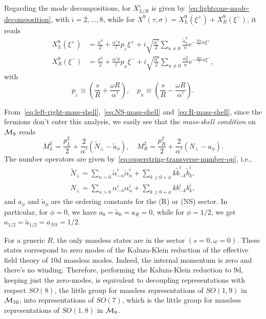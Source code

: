 Regarding the mode decompositions, for $X^i_{L/R}$ is given by~\eqref{eq:lightcone-mode-decomposition}, with $i = 2, \dots, 8$, while for $X^9 (\tau, \sigma) = X^9_L (\xi^+) + X^9_R (\xi^-)$, it reads
\begin{subequations}
\begin{align}
    X^{9}_L(\xi^+)     &= \frac{x^{9}}{2} + \frac{\alpha' \pi}{l} p_{\!_L} \xi^+ + i \sqrt{\frac{\alpha'}{2}} \sum_{n\neq 0} \frac{\tilde{\alpha}^{9}_n}{n}e^{-\frac{2\pi i}{l}n \xi^+} \\
    X^{9}_R(\xi^-)     &= \frac{x^{9}}{2} + \frac{\alpha' \pi}{l} p_{\!_R} \xi^- + i \sqrt{\frac{\alpha'}{2}} \sum_{n\neq 0} \frac{{\alpha}^{9}_n}{n}e^{-\frac{2\pi i}{l}n \xi^-},
\end{align}
\end{subequations}
with
\begin{equation}
    p_{\!_L} \equiv \left( \frac{s}{R} + \frac{\omega R}{\alpha'} \right), \quad p_{\!_R} \equiv \left( \frac{s}{R} - \frac{\omega R}{\alpha'} \right) .
\end{equation}

From~\eqref{eq:left-right-mass-shell},~\eqref{eq:NS-mass-shell} and~\eqref{eq:R-mass-shell}, since the fermions don't enter this analysis, we easily see that the \emph{mass-shell condition} on $\mathcal{M}_9$ reads
\begin{equation}\label{eq:superstring-mass-shell-m9}
    M^2_L = \frac{p^2_L}{2} + \frac{2}{\alpha'} \left( \tilde{N}_\perp - \tilde{a}_\phi \right), \quad M^2_R = \frac{p^2_R}{2} + \frac{2}{\alpha'} \left( {N}_\perp - {a}_\phi \right).
\end{equation}
The number operators are given by~\eqref{eq:superstring-transverse-number-op}, i.e.,
\begin{equation}\label{eq:superstring-numbers}
    \begin{aligned}
        \tilde{N}_\perp = \sum_{n > 0} \tilde{\alpha}_{-n}^i \tilde{\alpha}^i_n + \sum_{k \geq 0 + \phi} k \tilde{b}^i_{-k} \tilde{b}^i_k , \\
        N_\perp = \sum_{n > 0} \alpha_{-n}^i \alpha^i_n + \sum_{k \geq 0 + \phi} k b^i_{-k} b^i_k ,
\end{aligned}
\end{equation}
and $a_\phi$ and $\tilde{a}_\phi$ are the ordering constants for the (R) or (NS) sector. In particular, for $\phi = 0$, we have $a_0 = \tilde{a}_0 = a_{R} = 0$, while for $\phi = 1/2$, we get $a_{1/2} = \tilde{a}_{1/2} = a_{NS} = 1/2$.

For a generic $R$, the only massless states are in the sector $(s=0,\omega=0)$. These states correspond to zero modes of the Kaluza-Klein reduction of the effective field theory of $10$d massless modes. Indeed, the internal momentum is zero and there's no winding. Therefore, performing the Kaluza-Klein reduction to $9$d, keeping just the zero-modes, is equivalent to decoupling representations with respect $SO(8)$, the little group for massless representations of $SO(1,9)$ in $\mathcal{M}_{10}$, into representations of $SO(7)$, which is the little group for massless representations of $SO(1,8)$ in $\mathcal{M}_9$.

